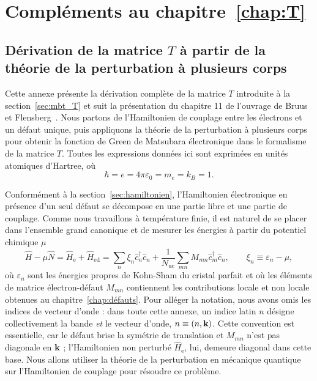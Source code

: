 \chapter{Compléments au chapitre~\ref{chap:T}}\label{annexe:T}

\section{Dérivation de la matrice $T$ à partir de la théorie de la perturbation à plusieurs corps}\label{annexe:défauts}

Cette annexe présente la dérivation complète de la matrice $T$ introduite à la section~\ref{sec:mbt_T} et suit la présentation du chapitre 11 de l'ouvrage de Bruus et Flensberg~\cite{bruusManyBodyQuantumTheory2004}. Nous partons de l'Hamiltonien de couplage entre les électrons et un défaut unique, puis appliquons la théorie de la perturbation à plusieurs corps pour obtenir la fonction de Green de Matsubara électronique dans le formalisme de la matrice $T$. Toutes les expressions données ici sont exprimées en unités atomiques d'Hartree, où
\begin{equation}
    \hbar = e = 4\pi\varepsilon_0 = m_e = k_B = 1.
    \label{eqn:ad_unités_hartree}
\end{equation}

Conformément à la section~\ref{sec:hamiltonien}, l'Hamiltonien électronique en présence d'un seul défaut se décompose en une partie libre et une partie de couplage. Comme nous travaillons à température finie, il est naturel de se placer dans l'ensemble grand canonique et de mesurer les énergies à partir du potentiel chimique $\mu$
\begin{equation}
    \hat{H}-\mu\hat{N} = \hat{H}_\text{e}+\hat{H}_\text{ed} = \sum_{n}\xi_{n}\hat{c}^\dag_{n}\hat{c}_{n}+\frac{1}{N_\text{uc}}\sum_{mn}M_{mn}\hat{c}^\dag_{m}\hat{c}_{n},\qquad \xi_n\equiv\varepsilon_n-\mu,
    \label{eqn:ad_hamiltonien}
\end{equation}
où $\varepsilon_{n}$ sont les énergies propres de Kohn-Sham du cristal parfait et où les éléments de matrice électron-défaut $M_{mn}$ contiennent les contributions locale et non locale obtenues au chapitre~\ref{chap:défauts}. Pour alléger la notation, nous avons omis les indices de vecteur d'onde : dans toute cette annexe, un indice latin $n$ désigne collectivement la bande \emph{et} le vecteur d'onde, $n\equiv(n,\mathbf{k})$. Cette convention est essentielle, car le défaut brise la symétrie de translation et $M_{mn}$ n'est pas diagonale en $\mathbf{k}$ ; l'Hamiltonien non perturbé $\hat{H}_\text{e}$, lui, demeure diagonal dans cette base. Nous allons utiliser la théorie de la perturbation en mécanique quantique sur l'Hamiltonien de couplage pour résoudre ce problème.

